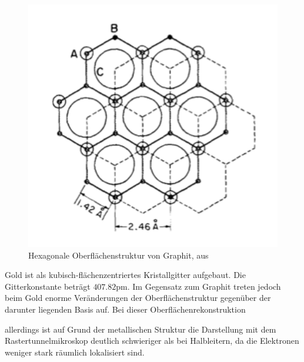 \begin{figure}
    \includegraphics[width=1.0\textwidth]{pics/graphite}
    \caption{Hexagonale Oberflächenstruktur von Graphit, aus \cite{park1986tunneling}}
    \label{fig:graphite}
\end{figure} 

Gold ist als kubisch-flächenzentriertes Kristallgitter aufgebaut. Die Gitterkonstante 
beträgt $407.82\mathrm{pm}$\cite{ohring1995engineering}. Im Gegensatz zum Graphit 
treten jedoch beim Gold enorme Veränderungen der Oberflächenstruktur gegenüber der 
darunter liegenden Basis auf. Bei dieser Oberflächenrekonstruktion

 allerdings ist auf Grund der 
metallischen Struktur die Darstellung mit dem Rastertunnelmikroskop deutlich 
schwieriger als bei Halbleitern, da die Elektronen weniger stark räumlich lokalisiert 
sind. 

